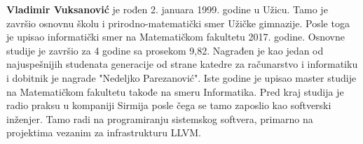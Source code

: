\documentclass[12pt,oneside]{memoir}
\begin{document}
\begin{biografija}
  \textbf{Vladimir Vuksanović} je rođen 2. januara 1999. godine u Užicu.
  Tamo je završio osnovnu školu i prirodno-matematički smer Užičke gimnazije.
  Posle toga je upisao informatički smer na Matematičkom fakultetu 2017. godine.
  Osnovne studije je završio za 4 godine sa prosekom 9,82.
  Nagrađen je kao jedan od najuspešnijih studenata generacije od strane katedre za računarstvo i informatiku i dobitnik je nagrade "Nedeljko Parezanović".
  Iste godine je upisao master studije na Matematičkom fakultetu takođe na smeru Informatika. 
  Pred kraj studija je radio praksu u kompaniji Sirmija posle čega se tamo zaposlio kao softverski inženjer.
  Tamo radi na programiranju sistemskog softvera, primarno na projektima vezanim za infrastrukturu LLVM.
\end{biografija}
\end{document}
